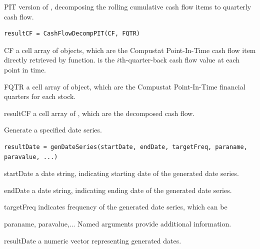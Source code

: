 PIT version of ,
decomposing the rolling cumulative cash flow items to quarterly cash flow.

\usage
   \begin{lstlisting}[numbers=none]
   resultCF = CashFlowDecompPIT(CF, FQTR)
   \end{lstlisting}
   
\inarg
   \begin{argdesc}
   \item[CF]  a cell array of \myfints{} objects, which are the Compustat	Point-In-Time cash flow 
              item directly retrieved by  function.
               is the $i$th-quarter-back cash flow value at each point in time.
   \item[FQTR] a cell array of \myfints{} object, which are the Compustat Point-In-Time financial quarters for each stock.
   \end{argdesc}
   
\outarg
   \begin{argdesc}
 	\item[resultCF] a cell array of \myfints{}, which are the decomposed cash flow.
   \end{argdesc}

Generate a specified date series.

\usage
   \begin{lstlisting}[numbers=none]
   resultDate = genDateSeries(startDate, endDate, targetFreq, paraname, paravalue, ...)
   \end{lstlisting}
\inarg
   \begin{argdesc}
   \item[startDate] a date string, indicating starting date of the generated date series.
   \item[endDate]  a date string, indicating ending date  of the generated date series.
   \item[targetFreq] indicates frequency of the generated date series, which can be 
                     
   \item[paraname, paravalue,...]
      Named arguments provide additional information. 
	  
   \end{argdesc}
\outarg
   \begin{argdesc}
   \item [resultDate] a numeric vector representing generated dates.
   \end{argdesc}

